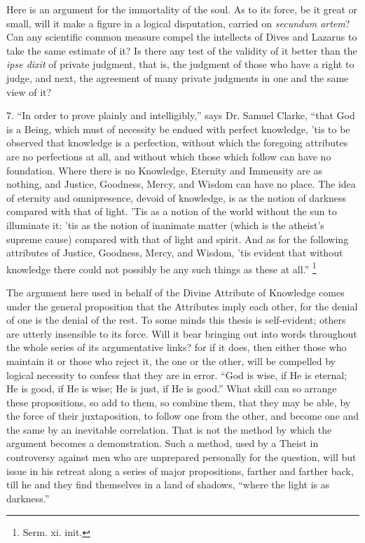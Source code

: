 Here is an argument for the immortality of the soul. As to its
force, be it great or small, will it make a figure in a logical
disputation, carried on \emph{secundum artem}? Can any scientific
common measure compel the intellects of Dives and Lazarus to take the
same estimate of it? Is there any test of the validity of it better
than the \emph{ipse dixit} of private judgment, that is, the judgment
of those who have a right to judge, and next, the agreement of
many private judgments in one and the same view of it?

7. ``In order to prove plainly and intelligibly,'' says Dr.
Samuel Clarke, ``that God is a Being, which must of necessity be
endued with perfect knowledge, 'tis to be observed that knowledge is a
perfection, without which the foregoing attributes are no perfections
at all, and without which those which follow can have no foundation.
Where there is no Knowledge, Eternity and Immensity are as nothing,
and Justice, Goodness, Mercy, and Wisdom can have no place. The idea
of eternity and omnipresence, devoid of knowledge, is as the notion of
darkness compared with that of light. 'Tis as a notion of the world
without the sun to illuminate it; 'tis as the notion of inanimate
matter (which is the atheist's supreme cause) compared with that of
light and spirit. And as for the following attributes of Justice,
Goodness, Mercy, and Wisdom, 'tis evident that without knowledge there
could not possibly be any such things as these at all.'' \footnote{Serm. xi. init.}

The argument here used in behalf of the Divine Attribute of
Knowledge comes under the general proposition that the Attributes
imply each other, for the denial of one is the denial of the rest. To
some minds this thesis is self-evident; others are utterly insensible
to its force. Will it bear bringing out into words throughout the
whole series of its argumentative links? for if it does, then either
those who maintain it or those who reject it, the one or the other,
will be compelled by logical necessity to confess that they are in error. ``God is wise, if He is eternal; He is good, if He is
wise; He is just, if He is good.'' What skill can so arrange these
propositions, so add to them, so combine them, that they may be able,
by the force of their juxtaposition, to follow one from the other, and
become one and the same by an inevitable correlation. That is not the
method by which the argument becomes a demonstration. Such a method,
used by a Theist in controversy against men who are unprepared
personally for the question, will but issue in his retreat along a
series of major propositions, farther and farther back, till he and
they find themselves in a land of shadows, ``where the light is as
darkness.''

